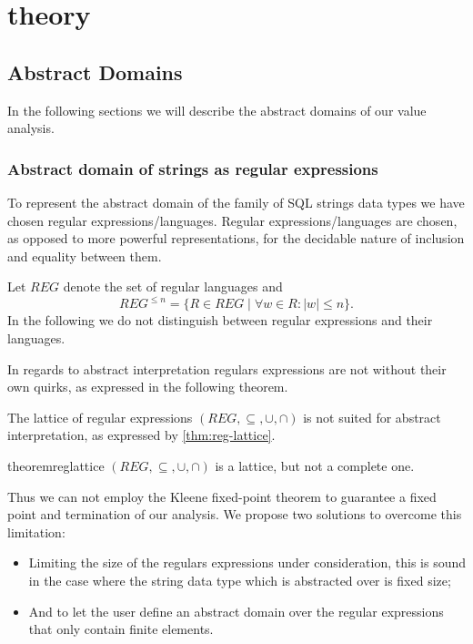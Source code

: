 \section{theory}\label{theory}

\subsection{Abstract Domains}\label{subsec:abstract_domains}

In the following sections we will describe the abstract domains of our value analysis.

\subsubsection{Abstract domain of strings as regular expressions}\label{subsubsec:abstract_domains_strings}

To represent the abstract domain of the family of SQL strings data types we have chosen regular expressions/languages.
Regular expressions/languages are chosen, as opposed to more powerful representations, for the decidable nature of inclusion and equality between them.

Let $REG$ denote the set of regular languages and
\begin{equation*}
    REG^{\leq n} = \{R \in REG \mid \forall w \in R : |w| \leq n\}.
\end{equation*}
In the following we do not distinguish between regular expressions and their languages.

In regards to abstract interpretation regulars expressions are not without their own quirks, as expressed in the following theorem.

The lattice of regular expressions $(REG, \subseteq, \cup, \cap)$ is not suited for abstract interpretation, as expressed by \autoref{thm:reg-lattice}.

\begin{restatable}{theorem}{reglattice}\label{thm:reg-lattice}
    $(REG, \subseteq, \cup, \cap)$ is a lattice, but not a complete one.
\end{restatable}

Thus we can not employ the Kleene fixed-point theorem to guarantee a fixed point and termination of our analysis.
We propose two solutions to overcome this limitation:
\begin{itemize}
    \item Limiting the size of the regulars expressions under consideration, this is sound in the case where the string data type which is abstracted over is fixed size;
    \item And to let the user define an abstract domain over the regular expressions that only contain finite elements.
\end{itemize}

